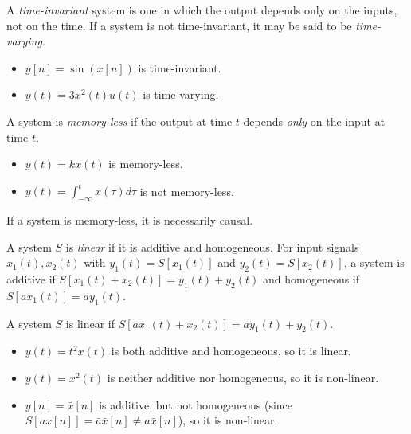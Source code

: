\begin{defn}
    A \emph{time-invariant} system is one in which the output depends only on the inputs, not on the time. If a system is not time-invariant, it may be said to be \emph{time-varying}.
\end{defn}

\begin{exmp}\proofbreak
    \begin{itemize}
        \item $y[n] = \sin(x[n])$ is time-invariant.
        \item $y(t) = 3x^2(t)u(t)$ is time-varying.
    \end{itemize}
\end{exmp}

\begin{defn}
    A system is \emph{memory-less} if the output at time $t$ depends \emph{only} on the input at time $t$.
\end{defn}

\begin{exmp}\proofbreak
    \begin{itemize}
        \item $y(t) = kx(t)$ is memory-less.
        \item $y(t) = \int_{-\infty}^{t}x(\tau)d\tau$ is not memory-less.
    \end{itemize}
\end{exmp}

\begin{rmk}
    If a system is memory-less, it is necessarily causal.
\end{rmk}

\begin{defn}
    A system $S$ is \emph{linear} if it is additive and homogeneous. For input signals $x_1(t), x_2(t)$ with $y_1(t) = S[x_1(t)]$ and $y_2(t) = S[x_2(t)]$, a system is additive if $S[x_1(t) + x_2(t)] = y_1(t) + y_2(t)$ and homogeneous if $S[ax_1(t)] = ay_1(t)$.
\end{defn}

\begin{prop}
    A system $S$ is linear if $S[ax_1(t) + x_2(t)] = ay_1(t) + y_2(t)$.
\end{prop}

\begin{exmp}\proofbreak
    \begin{itemize}
        \item $y(t) = t^2x(t)$ is both additive and homogeneous, so it is linear.
        \item $y(t) = x^2(t)$ is neither additive nor homogeneous, so it is non-linear.
        \item $y[n] = \bar{x}[n]$ is additive, but not homogeneous (since $S[ax[n]] = \bar{a}\bar{x}[n] \neq a\bar{x}[n]$), so it is non-linear.
    \end{itemize}
\end{exmp}

